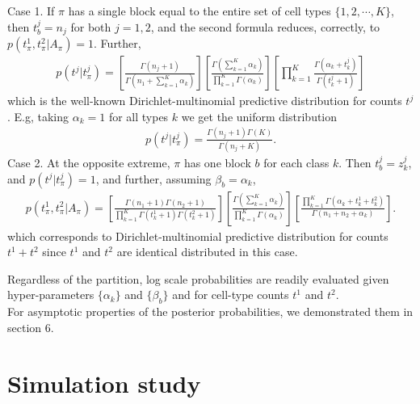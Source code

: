 \documentclass[11pt]{amsart}
\begin{document}
Case 1. If $\pi$ has a single block equal to the entire
 set of cell types $\{1,2, \cdots, K\}$,  then $t^j_b=n_j$ for both $j=1,2$,
and the second formula reduces, correctly, to 
$p(t^1_{\pi},t^2_{\pi}| A_{\pi}) = 1$.  Further,
\begin{eqnarray*}
p(t^j | t^j_{\pi}) = 
\left[ \frac{ \Gamma(n_j +1 ) }{ \Gamma( n_1 + \sum_{k=1}^K \alpha_k ) }
\right]
\left[ \frac{\Gamma( \sum_{k =1}^K \alpha_k )}{
                \prod_{k=1}^K \Gamma( \alpha_k ) } \right]
       \left[    \prod_{k=1}^K    \frac{  \Gamma(\alpha_k + t^j_k)}{
                \Gamma(t^j_k + 1 )}\right]
\end{eqnarray*}
which is the well-known Dirichlet-multinomial predictive distribution
for counts $t^j$ \cite{Wag}.  E.g, taking $\alpha_k=1$ for all types $k$ 
we get the uniform distribution
\begin{eqnarray*}
p(t^j | t^j_{\pi}) = 
 \frac{ \Gamma(n_j +1 ) \Gamma(K) }{ \Gamma( n_j + K ) }.
\end{eqnarray*}
Case 2. At the opposite extreme, $\pi$  has one block $b$ for each
 class $k$. Then $t^j_b = z^j_k$, and $p(t^j | t^j_{\pi}) = 1$, and 
further, assuming $\beta_b = \alpha_k$,
\begin{eqnarray*}
p(t^1_{\pi},t^2_{\pi}| A_{\pi}) =
 \left[ \frac{ \Gamma(n_1+1) \Gamma(n_2+1) }{ \prod_{k=1}^K 
   \Gamma(t^1_k+1) 
   \Gamma( t^2_k + 1 )} \right] 
\left[ \frac{\Gamma( \sum_{k=1}^K \alpha_k  )}{
   \prod_{k=1}^K \Gamma(\alpha_k )} \right] 
 \left[ \frac{ \prod_{k=1}^K \Gamma( \alpha_k + t^1_k + t^2_k )}{
	\Gamma( n_1 + n_2 + \alpha_k  )} \right].
\end{eqnarray*}
which corresponds to Dirichlet-multinomial predictive distribution for counts $t^1 + t^2$ 
since $t^1$ and $t^2$ are identical distributed in this case.

Regardless of the partition,
log scale probabilities are readily evaluated 
given hyper-parameters $\{ \alpha_k \}$ and $\{ \beta_b \}$ and for
cell-type counts $t^1$ and $t^2$. \\
For asymptotic properties of the posterior probabilities, we demonstrated them in section 6. 
 
\section{Simulation study} 
\end{document}
